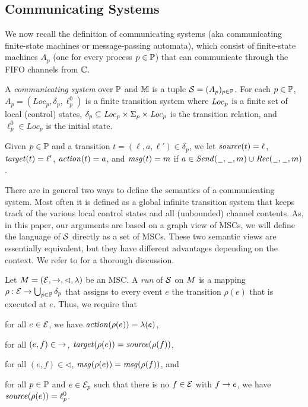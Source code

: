 \documentclass{article}
\begin{document}
\subsection{Communicating Systems}

We now recall the definition of communicating systems (aka communicating finite-state
machines or message-passing automata), which consist of finite-state machines $A_p$
(one for every process $p \in \mathbb{P}$) that can communicate through the FIFO channels
from $\mathbb{C}$.

\begin{definition}\label{def:cs}
A \emph{communicating system} over $\mathbb{P}$ and $\mathbb{M}$ is a tuple
   $ \mathcal{S} = (A_p)_{p\in\mathbb{P}}$. For each
   $p \in \mathbb{P}$, $A_p = (Loc_p, \delta_p, \ell^0_p)$ is a finite transition system where
   $\mathit{Loc}_p$ is a finite set of local (control) states, $\delta_p
   \subseteq \mathit{Loc}_p \times \Sigma_{p} \times \mathit{Loc}_p$ is the
   transition relation, and $\ell^0_p \in Loc_p$ is the initial state.
\end{definition}

Given $p \in \mathbb{P}$ and a transition $t = (\ell,a,\ell') \in \delta_p$, we let
$\mathit{source}(t) = \ell$, $\mathit{target}(t) = \ell'$, $\mathit{action}(t) = a$, and
$\mathit{msg}(t) = m$ if $a \in {\mathit{Send}(\hspace{0.1em}\underline{\hspace{0.5em}}\hspace{0.1em},\hspace{0.1em}\underline{\hspace{0.5em}}\hspace{0.1em},m)} \cup {\mathit{Rec}(\hspace{0.1em}\underline{\hspace{0.5em}}\hspace{0.1em},\hspace{0.1em}\underline{\hspace{0.5em}}\hspace{0.1em},m)}$.

\smallskip

There are in general two ways to define the semantics of a communicating system.
Most often it is defined as a global infinite transition system that keeps track
of the various local control states and all (unbounded) channel contents.
As, in this paper, our arguments are based on a graph view of MSCs, we will define
the language of $\mathcal{S}$ directly as a set of MSCs. These two semantic views are essentially
equivalent, but they have different advantages depending on the context.
We refer to \cite{CyriacG14} for a thorough discussion.

Let $M = (\mathcal{E},\to,\lhd,\lambda)$ be an MSC.
A \emph{run} of $\mathcal{S}$ on $M$ is a mapping
$\rho: \mathcal{E} \to \bigcup_{p \in \mathbb{P}} \delta_p$
that assigns to every event $e$ the transition $\rho(e)$
that is executed at $e$. Thus, we require that
\begin{enumerate*}[label={(\roman*)}]
\item for all $e \in \mathcal{E}$, we have $\mathit{action}(\rho(e)) = \lambda(e)$,
\item for all $(e,f) \in {\to}$, $\mathit{target}(\rho(e)) = \mathit{source}(\rho(f))$,
\item for all $(e,f) \in {\lhd}$, $\mathit{msg}(\rho(e)) = \mathit{msg}(\rho(f))$,
and
\item for all $p \in \mathbb{P}$ and $e \in \mathcal{E}_p$ such that there is no $f \in \mathcal{E}$ with $f \to e$, we have $\mathit{source}(\rho(e)) = \ell_p^0$.
\end{enumerate*}
\end{document}
